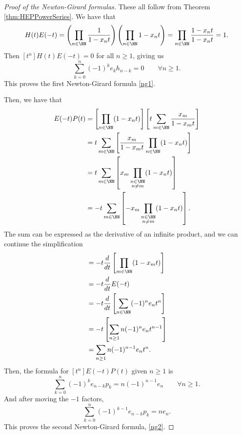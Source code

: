 \documentclass{article}
\begin{document}
\begin{proof}
    [Proof of the Newton-Girard formulas]
    These all follow from Theorem \ref{thm:HEPPowerSeries}. We have that
    \[
        H(t)E(-t) 
        = \left(\prod_{n\in\NN}\frac{1}{1-x_nt}\right)\left(\prod_{n\in\NN}1-x_nt\right) 
        = \prod_{n\in\NN}\frac{1-x_nt}{1-x_nt} = 1.
    \]
    Then $[t^n] H(t)E(-t) = 0$ for all $n \geq 1$, giving us
    \[
        \sum_{k=0}^n (-1)^k e_k h_{n-k} = 0 \qquad \forall n\geq 1.
    \]
    This proves the first Newton-Girard formula \eqref{ng1}.

    Then, we have that
    \begin{align*}
        E(-t)P(t) &= \left[\prod_{n\in\NN}(1-x_nt)\right]\left[t\sum_{m\in\NN}\frac{x_m}{1-x_mt}\right] \\
                  &= t\sum_{m\in\NN}\left[\frac{x_m}{1-x_mt}\prod_{n\in\NN}(1-x_nt)\right] \\
                  &= t\sum_{m\in\NN} \left[x_m\prod_{\substack{n\in\NN \\ n\neq m}}(1-x_nt)\right] \\
                  &= -t\sum_{m\in\NN} \left[-x_m\prod_{\substack{n\in\NN \\ n\neq m}}(1-x_nt)\right].
    \end{align*}
    The sum can be expressed as the derivative of an infinite product, and we can continue the simplification
    \begin{align*}
                  &= -t\frac{d}{dt}\left[\prod_{m\in\NN}(1-x_mt)\right] \\
                  &= -t\frac{d}{dt}E(-t) \\
                  &= -t\frac{d}{dt}\left[\sum_{n\in\NN}(-1)^n e_nt^n\right] \\
                  &= -t\left[\sum_{n\geq 1}n(-1)^n e_nt^{n-1}\right] \\
                  &= \sum_{n\geq 1}n(-1)^{n-1} e_nt^n.
    \end{align*}
    Then, the formula for $[t^n]E(-t)P(t)$ given $n \geq 1$ is
    \[
        \sum_{k=0}^n (-1)^k e_{n-k}p_k = n(-1)^{n-1}e_n \qquad \forall n \geq 1.
    \]
    And after moving the $-1$ factors,
    \[
        \sum_{k=0}^n (-1)^{k-1} e_{n-k}p_k = ne_n.
    \]
    This proves the second Newton-Girard formula, \eqref{ng2}.


\end{proof}
\end{document}

